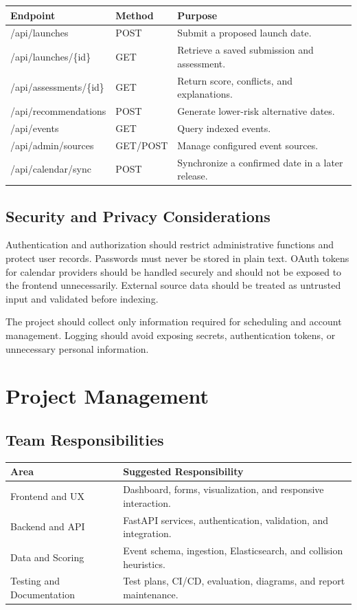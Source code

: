 \documentclass[12pt]{article}
\begin{document}
\begin{longtable}{p{}p{}p{}}
\toprule
\textbf{Endpoint} & \textbf{Method} & \textbf{Purpose}\\
\midrule
/api/launches & POST & Submit a proposed launch date.\\
/api/launches/\{id\} & GET & Retrieve a saved submission and assessment.\\
/api/assessments/\{id\} & GET & Return score, conflicts, and explanations.\\
/api/recommendations & POST & Generate lower-risk alternative dates.\\
/api/events & GET & Query indexed events.\\
/api/admin/sources & GET/POST & Manage configured event sources.\\
/api/calendar/sync & POST & Synchronize a confirmed date in a later release.\\
\bottomrule
\end{longtable}

\subsection{Security and Privacy Considerations}
Authentication and authorization should restrict administrative functions and protect user records. Passwords must never be stored in plain text. OAuth tokens for calendar providers should be handled securely and should not be exposed to the frontend unnecessarily. External source data should be treated as untrusted input and validated before indexing.

The project should collect only information required for scheduling and account management. Logging should avoid exposing secrets, authentication tokens, or unnecessary personal information.

\section{Project Management}

\subsection{Team Responsibilities}
\begin{longtable}{p{}p{}}
\toprule
\textbf{Area} & \textbf{Suggested Responsibility}\\
\midrule
Frontend and UX & Dashboard, forms, visualization, and responsive interaction.\\
Backend and API & FastAPI services, authentication, validation, and integration.\\
Data and Scoring & Event schema, ingestion, Elasticsearch, and collision heuristics.\\
Testing and Documentation & Test plans, CI/CD, evaluation, diagrams, and report maintenance.\\
\bottomrule
\end{longtable}
\end{document}
